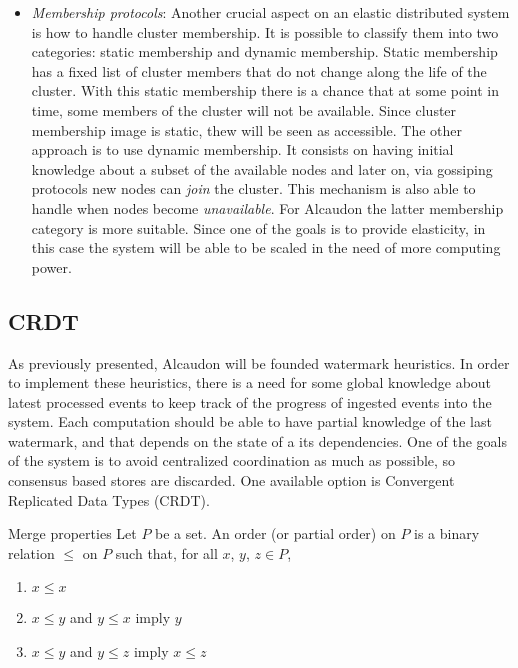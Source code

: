\begin{itemize}
\item \textit{Membership protocols}: Another crucial aspect on an elastic
  distributed system is how to handle cluster membership. It is possible to
  classify them into two categories: static membership and dynamic membership.
  Static membership has a fixed list of cluster members that do not change along
  the life of the cluster. With this static membership there is a chance that at
  some point in time, some members of the cluster will not be available. Since
  cluster membership image is static, thew will be seen as accessible. The other
  approach is to use dynamic membership. It consists on having initial knowledge
  about a subset of the available nodes and later on, via gossiping
  protocols\cite{gossip} new nodes can \textit{join} the cluster. This mechanism
  is also able to handle when nodes become \textit{unavailable}. For Alcaudon
  the latter membership category is more suitable. Since one of the goals is to
  provide elasticity, in this case the system will be able to be scaled in the
  need of more computing power.
\end{itemize}

\subsection{CRDT}

As previously presented, Alcaudon will be founded watermark heuristics. In order
to implement these heuristics, there is a need for some global knowledge about
latest processed events to keep track of the progress of ingested events into
the system. Each computation should be able to have partial knowledge of the
last watermark, and that depends on the state of a its dependencies. One of the
goals of the system is to avoid centralized coordination as much as possible, so
consensus based stores are discarded. One available option is Convergent
Replicated Data Types (CRDT)\cite{crdt}.


\begin{definition}{Merge properties}
  Let $P$ be a set. An order (or partial order) on $P$ is a binary relation
  $\leq$ on $P$ such that, for all $x$, $y$, $z \in P$,
  \begin{enumerate}
  \item $x \leq x$
  \item $x \leq y$ and $y \leq x$ imply $y$
  \item $x \leq y$ and $y \leq z$ imply $x \leq z$
  \end{enumerate}
\end{definition}

